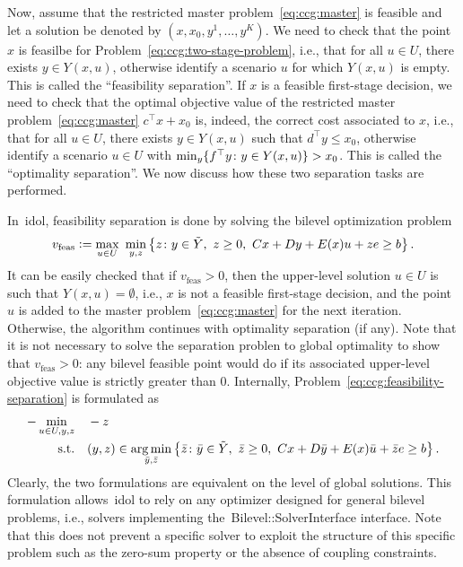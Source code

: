 Now, assume that the restricted master problem~\eqref{eq:ccg:master} is
feasible and let a solution be denoted by $(x,x_0,y^1,\dotsc,y^K)$. We need to
check that the point $x$ is feasilbe for
Problem~\eqref{eq:ccg:two-stage-problem}, i.e., that for all $u\in U$, there
exists $y\in Y(x,u)$, otherwise identify a scenario $u$ for which $Y(x,u)$ is
empty. This is called the ``feasibility separation''. If $x$ is a feasible
first-stage decision, we need to check that the optimal objective value of the
restricted master problem~\eqref{eq:ccg:master} $c^\top x + x_0$ is, indeed,
the correct cost associated to $x$, i.e., that for all $u\in U$, there exists
$y\in Y(x,u)$ such that $d^\top y \le x_0$, otherwise identify a scenario
$u\in U$ with $\min_y\{ f^\top y \colon y\in Y(x,u) \} > x_0$. This is called
the ``optimality separation''. We now discuss how these two separation tasks
are performed.

In~\textsf{idol}, feasibility separation is done by solving the bilevel
optimization problem
%
\begin{equation}
    \label{eq:ccg:feasibility-separation}
    v_\text{feas} \mathrel{{\mathop:}{=}} \max_{u\in U} \ \min_{y,z} \left\{ z \colon
        y\in\tilde{Y}, \ z\ge 0, \ Cx + Dy + E(x)u + ze \ge b
    \right\}.
\end{equation}
It can be easily checked that if $v_\text{feas} > 0$, then the upper-level
solution $u\in U$ is such that $Y(x,u) = \emptyset$, i.e., $x$ is not a
feasible first-stage decision, and the point $u$ is added to the master
problem~\eqref{eq:ccg:master} for the next iteration. Otherwise, the algorithm
continues with optimality separation (if any). Note that it is not necessary
to solve the separation problen to global optimality to show that
$v_\text{feas} > 0$: any bilevel feasible point would do if its associated
upper-level objective value is strictly greater than 0. Internally,
Problem~\eqref{eq:ccg:feasibility-separation} is formulated as
%
\begin{align*}
    - \min_{u\in U,y,z} \quad & -z \\
    \text{s.t.} \quad & (y,z) \in \operatorname*{arg\,min}_{\bar{y},\bar{z}} \left\{ \bar{z} \colon
        \bar{y}\in\tilde{Y}, \ \bar{z}\ge 0, \ Cx + D\bar{y} + E(x)\bar{u} + \bar{z}e \ge b
    \right\}.
\end{align*}
Clearly, the two formulations are equivalent on the level of global solutions.
This formulation allows~\textsf{idol} to rely on any optimizer designed for
general bilevel problems, i.e., solvers implementing
the~\textsf{Bilevel::SolverInterface} interface. Note that this does not
prevent a specific solver to exploit the structure of this specific problem
such as the zero-sum property or the absence of coupling constraints.

